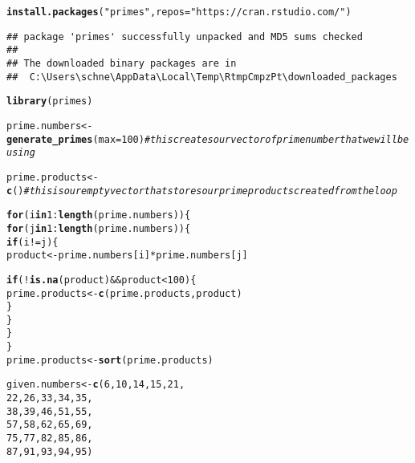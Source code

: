 \documentclass{article}\usepackage[]{graphicx}\usepackage[]{xcolor}
\makeatletter
\newcommand{\hlnum}[1]{\textcolor[rgb]{0.686,0.059,0.569}{#1}}%
\newcommand{\hlsng}[1]{\textcolor[rgb]{0.192,0.494,0.8}{#1}}%
\newcommand{\hlcom}[1]{\textcolor[rgb]{0.678,0.584,0.686}{\textit{#1}}}%
\newcommand{\hlopt}[1]{\textcolor[rgb]{0,0,0}{#1}}%
\newcommand{\hldef}[1]{\textcolor[rgb]{0.345,0.345,0.345}{#1}}%
\newcommand{\hlkwa}[1]{\textcolor[rgb]{0.161,0.373,0.58}{\textbf{#1}}}%
\newcommand{\hlkwb}[1]{\textcolor[rgb]{0.69,0.353,0.396}{#1}}%
\newcommand{\hlkwc}[1]{\textcolor[rgb]{0.333,0.667,0.333}{#1}}%
\newcommand{\hlkwd}[1]{\textcolor[rgb]{0.737,0.353,0.396}{\textbf{#1}}}%
\newenvironment{kframe}{%
 \def\at@end@of@kframe{}%
 \ifinner\ifhmode%
  \def\at@end@of@kframe{\end{minipage}}%
  \begin{minipage}{\columnwidth}%
 \fi\fi%
 \def\FrameCommand##1{\hskip\@totalleftmargin \hskip-\fboxsep
 \colorbox{shadecolor}{##1}\hskip-\fboxsep
     \hskip-\linewidth \hskip-\@totalleftmargin \hskip\columnwidth}%
 \MakeFramed {\advance\hsize-\width
   \@totalleftmargin\z@ \linewidth\hsize
   \@setminipage}}%
 {\par\unskip\endMakeFramed%
 \at@end@of@kframe}
\newenvironment{knitrout}{}{} %
\makeatother
\begin{document}
\begin{enumerate}
\begin{knitrout}\scriptsize
{}\color{fgcolor}\begin{kframe}
\begin{alltt}
\hlkwd{install.packages}\hldef{(}\hlsng{"primes"}\hldef{,} \hlkwc{repos}\hldef{=} \hlsng{"https://cran.rstudio.com/"}\hldef{)}
\end{alltt}
\begin{verbatim}
## package 'primes' successfully unpacked and MD5 sums checked
## 
## The downloaded binary packages are in
## 	C:\Users\schne\AppData\Local\Temp\RtmpCmpzPt\downloaded_packages
\end{verbatim}
\begin{alltt}
\hlkwd{library}\hldef{(primes)}

\hldef{prime.numbers} \hlkwb{<-} \hlkwd{generate_primes}\hldef{(}\hlkwc{max} \hldef{=} \hlnum{100}\hldef{)} \hlcom{#this creates our vector of prime number that we will be using}



\hldef{prime.products} \hlkwb{<-} \hlkwd{c}\hldef{()} \hlcom{#this is our empty vector that stores our prime products created from the loop }

\hlkwa{for} \hldef{(i} \hlkwa{in} \hlnum{1}\hlopt{:}\hlkwd{length}\hldef{(prime.numbers)) \{}
  \hlkwa{for} \hldef{(j} \hlkwa{in} \hlnum{1}\hlopt{:}\hlkwd{length}\hldef{(prime.numbers)) \{}
    \hlkwa{if}\hldef{( i} \hlopt{!=} \hldef{j)\{}
      \hldef{product} \hlkwb{<-} \hldef{prime.numbers[i]} \hlopt{*} \hldef{prime.numbers[j]}

      \hlkwa{if} \hldef{(}\hlopt{!}\hlkwd{is.na}\hldef{(product)} \hlopt{&&} \hldef{product} \hlopt{<} \hlnum{100}\hldef{) \{}
        \hldef{prime.products} \hlkwb{<-} \hlkwd{c}\hldef{(prime.products, product)}
      \hldef{\}}
    \hldef{\}}
  \hldef{\}}
\hldef{\}}
\hldef{prime.products} \hlkwb{<-} \hlkwd{sort}\hldef{(prime.products)}


\hldef{given.numbers} \hlkwb{<-} \hlkwd{c}\hldef{(} \hlnum{6}\hldef{,} \hlnum{10}\hldef{,} \hlnum{14}\hldef{,} \hlnum{15}\hldef{,} \hlnum{21}\hldef{,}
                    \hlnum{22}\hldef{,} \hlnum{26}\hldef{,} \hlnum{33}\hldef{,} \hlnum{34}\hldef{,} \hlnum{35}\hldef{,}
                    \hlnum{38}\hldef{,} \hlnum{39}\hldef{,} \hlnum{46}\hldef{,} \hlnum{51}\hldef{,} \hlnum{55}\hldef{,}
                    \hlnum{57}\hldef{,} \hlnum{58}\hldef{,} \hlnum{62}\hldef{,} \hlnum{65}\hldef{,} \hlnum{69}\hldef{,}
                    \hlnum{75}\hldef{,} \hlnum{77}\hldef{,} \hlnum{82}\hldef{,} \hlnum{85}\hldef{,} \hlnum{86}\hldef{,}
                    \hlnum{87}\hldef{,} \hlnum{91}\hldef{,} \hlnum{93}\hldef{,} \hlnum{94}\hldef{,} \hlnum{95}\hldef{)}


\end{alltt}
\end{kframe}
\end{knitrout}
\end{enumerate}
\end{document}
